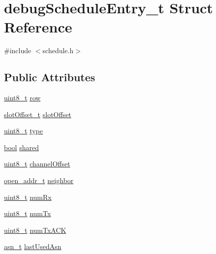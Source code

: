 \hypertarget{structdebug_schedule_entry__t}{}\section{debug\+Schedule\+Entry\+\_\+t Struct Reference}
\label{structdebug_schedule_entry__t}


{\ttfamily \#include $<$schedule.\+h$>$}

\subsection*{Public Attributes}
\begin{DoxyCompactItemize}
\item 
\hyperlink{_p_e___types_8h_aba7bc1797add20fe3efdf37ced1182c5}{uint8\+\_\+t} \hyperlink{structdebug_schedule_entry__t_ab2b6485ce752b440885f88f5506c6d6e}{row}
\item 
\hyperlink{group___schedule_ga30a663860a70d8c9db2c3a8e66f544fc}{slot\+Offset\+\_\+t} \hyperlink{structdebug_schedule_entry__t_afb3995e0f8a314b53f45958c62256841}{slot\+Offset}
\item 
\hyperlink{_p_e___types_8h_aba7bc1797add20fe3efdf37ced1182c5}{uint8\+\_\+t} \hyperlink{structdebug_schedule_entry__t_ae9c3f17551ebf437fae27900b287591b}{type}
\item 
\hyperlink{_p_e___types_8h_a97a80ca1602ebf2303258971a2c938e2}{bool} \hyperlink{structdebug_schedule_entry__t_abcb60365622ad596a849bb79ac909dad}{shared}
\item 
\hyperlink{_p_e___types_8h_aba7bc1797add20fe3efdf37ced1182c5}{uint8\+\_\+t} \hyperlink{structdebug_schedule_entry__t_a753bd0142c40e6fe63e1aae2e2ff201b}{channel\+Offset}
\item 
\hyperlink{structopen__addr__t}{open\+\_\+addr\+\_\+t} \hyperlink{structdebug_schedule_entry__t_ac7937ec3d5e713dd63f9c68e2bea84ce}{neighbor}
\item 
\hyperlink{_p_e___types_8h_aba7bc1797add20fe3efdf37ced1182c5}{uint8\+\_\+t} \hyperlink{structdebug_schedule_entry__t_a6b7c99777bf187ca7b2992a08aaaa109}{num\+Rx}
\item 
\hyperlink{_p_e___types_8h_aba7bc1797add20fe3efdf37ced1182c5}{uint8\+\_\+t} \hyperlink{structdebug_schedule_entry__t_adc3fb28e735838c06b8a82014228ea74}{num\+Tx}
\item 
\hyperlink{_p_e___types_8h_aba7bc1797add20fe3efdf37ced1182c5}{uint8\+\_\+t} \hyperlink{structdebug_schedule_entry__t_a94b93c2b00124f9dd7dcc4615a648d84}{num\+Tx\+A\+CK}
\item 
\hyperlink{structasn__t}{asn\+\_\+t} \hyperlink{structdebug_schedule_entry__t_a7162d1d1b4e7b8c899b2d082eb49da16}{last\+Used\+Asn}
\end{DoxyCompactItemize}


